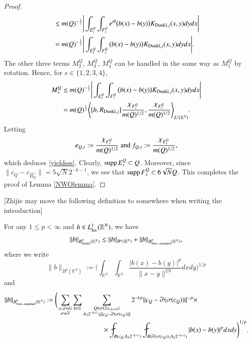 \documentclass[12pt]{amsart}
\begin{document}
\begin{proof}
\begin{align*}
   &\lesssim m(Q)^{-\frac{1}{2}}\Bigg|\int_{E_1^Q}\int_{F_1^Q}e^{i\theta}\big(b(x)-b(y)\big)K_{{\rm Dunkl},j}(x,y)dydx\Bigg|\nonumber\\
   &= m(Q)^{-\frac{1}{2}}\Bigg|\int_{E_1^Q}\int_{F_1^Q}\big(b(x)-b(y)\big)K_{{\rm Dunkl},j}(x,y)dydx\Bigg|.
\end{align*}
The other three terms  $M_2^Q$, $M_3^Q$, $M_4^Q$ can be handled in the same way as $M_1^Q$ by rotation. Hence, for $s\in\{1,2,3,4\}$,
\begin{align}
  M_s^Q&\lesssim m(Q)^{-\frac{1}{2}}\Bigg|\int_{E_s^Q}\int_{F_s^Q}\big(b(x)-b(y)\big)K_{{\rm Dunkl},j}(x,y)dydx\Bigg|\nonumber\\
  &=m(Q)^{\frac{1}{2}}\Bigg\langle [b,R_{{\rm Dunkl},j}]\frac{\chi_{F_s^Q}}{m(Q)^{1/2}},\frac{\chi_{E_s^Q}}{m(Q)^{1/2}}\Bigg\rangle_{L^2(\mathbb{R}^N)}.
\end{align}
Letting
$$e_{Q,s}:=\frac{\chi_{F_s^Q}}{m(Q)^{1/2}}\  {\rm and}\  f_{Q,s}:=\frac{\chi_{E_s^Q}}{m(Q)^{1/2}},$$
which deduces \eqref{yieldsss}.
Clearly, ${\rm supp}{\hspace{.05cm}} E_s^Q\subset Q$. Moreover, since $\|c_Q-c_{\widehat{B_Q}}\|=5\sqrt{N}2^{-k-1}$, we see that ${\rm supp}{\hspace{.05cm}} F_s^Q\subset  6\sqrt{N}Q$. This completes the proof of Lemma \ref{NWOlemma}.
\end{proof}
{\color{red}[Zhijie may move the following definition to somewhere when writing the introduction]}
\begin{lemma}\label{besovlemma}
For any $1\leq p<\infty$ and $b\in L^1_{\rm loc}(\mathbb{R}^N)$, we have
  \begin{align}
  \|b\|_{B^{p}_{{\rm Dunkl}}(\mathbb{R}^N)}\lesssim \|b\|_{B^p(\mathbb{R}^N)}+\|b\|_{B^{p}_{{\rm Non}-{\rm standard}}(\mathbb{R}^N)},
  \end{align}
  where we write
  $$\|b\|_{B^p(\mathbb{R}^N)}:=\Bigg({\int_{\mathbb{R}^N}\int_{\mathbb{R}^N}\frac{|b(x)-b(y)|^p}{\|x-y\|^{2N}}}dxdy\Bigg)^{1/p}$$
  and
  \begin{align*}
  \|b\|_{B^{p}_{{\rm Non}-{\rm standard}}(\mathbb{R}^N)}
  &:=\Bigg(\sum_{{\substack{\sigma,\widetilde{\sigma}\in G \\ \sigma\neq \widetilde{\sigma}}}}\sum_{k\in\mathbb{Z}}\sum_{{\substack{Q\in\sigma(\mathbb{D}_{\Gamma,k+10})\\ A_22^{-k+1}\leq \|c_Q-\widetilde{\sigma}(\sigma(c_Q))\|}}}2^{-kp}\|c_Q-\widetilde{\sigma}(\sigma(c_Q))\|^{-p}\times\nonumber\\
  &\hspace{3.0cm}\times\fint_{B(c_Q,A_22^{-k+1})}\fint_{B(\widetilde{\sigma}(\sigma(c_Q)),A_22^{-k+1})}|b(x)-b(y)|^pdxdy\Bigg)^{1/p}.
  \end{align*}
\end{lemma}
\end{document}
